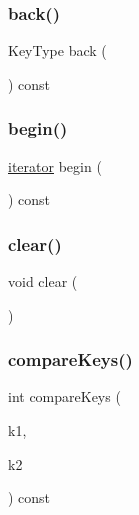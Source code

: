 \mbox{\label{classMap_adfa4b8f8e4f5ecc11fb76a3efba70d70}} 
\subsubsection{\texorpdfstring{back()}{back()}}
{\footnotesize\ttfamily Key\+Type back (\begin{DoxyParamCaption}{ }\end{DoxyParamCaption}) const}

\mbox{\label{classMap_a0c62c15c8ed609e7e5e9518cf5f5c712}} 
\subsubsection{\texorpdfstring{begin()}{begin()}}
{\footnotesize\ttfamily \mbox{\hyperlink{classMap_1_1iterator}{iterator}} begin (\begin{DoxyParamCaption}{ }\end{DoxyParamCaption}) const\hspace{0.3cm}{\ttfamily [inline]}}

\mbox{\label{classMap_ac8bb3912a3ce86b15842e79d0b421204}} 
\subsubsection{\texorpdfstring{clear()}{clear()}}
{\footnotesize\ttfamily void clear (\begin{DoxyParamCaption}{ }\end{DoxyParamCaption})}

\mbox{\label{classMap_a3c48bf82825a2262058961e44e376151}} 
\subsubsection{\texorpdfstring{compare\+Keys()}{compareKeys()}}
{\footnotesize\ttfamily int compare\+Keys (\begin{DoxyParamCaption}\item[{const Key\+Type \&}]{k1,  }\item[{const Key\+Type \&}]{k2 }\end{DoxyParamCaption}) const\hspace{0.3cm}{\ttfamily [inline]}}

